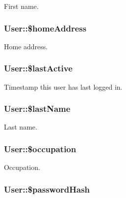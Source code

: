 \label{classUser_ab4216ecb16d420f69cb32659a6744846}
First name. \hypertarget{classUser_a1588ee38de5c013009e557c4806178cf}{
\subsubsection[{\$homeAddress}]{\setlength{\rightskip}{0pt plus 5cm}User::\$homeAddress}}
\label{classUser_a1588ee38de5c013009e557c4806178cf}
Home address. \hypertarget{classUser_ad393a3516b907e89164108fc68ae05bf}{
\subsubsection[{\$lastActive}]{\setlength{\rightskip}{0pt plus 5cm}User::\$lastActive}}
\label{classUser_ad393a3516b907e89164108fc68ae05bf}
Timestamp this user has last logged in. \hypertarget{classUser_a4f49336b16dc2612dae2069a078f4f14}{
\subsubsection[{\$lastName}]{\setlength{\rightskip}{0pt plus 5cm}User::\$lastName}}
\label{classUser_a4f49336b16dc2612dae2069a078f4f14}
Last name. \hypertarget{classUser_a434aa8daa7cab054eb51aa15546156b1}{
\subsubsection[{\$occupation}]{\setlength{\rightskip}{0pt plus 5cm}User::\$occupation}}
\label{classUser_a434aa8daa7cab054eb51aa15546156b1}
Occupation. \hypertarget{classUser_a329d5d877d90e34b99c969fd573c8f50}{
\subsubsection[{\$passwordHash}]{\setlength{\rightskip}{0pt plus 5cm}User::\$passwordHash}}
